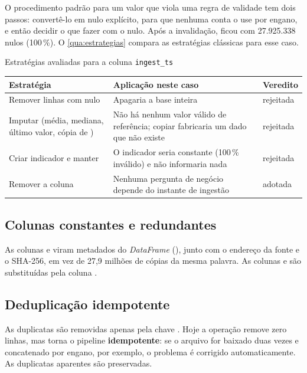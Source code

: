 O procedimento padrão para um valor que viola uma regra de validade tem dois
passos: convertê-lo em nulo explícito, para que nenhuma conta o use por engano,
e então decidir o que fazer com o nulo. Após a invalidação, 
ficou com 27.925.338 nulos (100\,\%). O \autoref{qua:estrategias} compara as
estratégias clássicas para esse caso.

\begin{quadro}[htbp]
\caption{\label{qua:estrategias}Estratégias avaliadas para a coluna \texttt{ingest\_ts}}
\begin{corpotabela}
\begin{tabularx}{\textwidth}{|L{4.6cm}|Y|C{1.8cm}|}
\hline
\textbf{Estratégia} & \textbf{Aplicação neste caso} & \textbf{Veredito} \\ \hline
Remover linhas com nulo & Apagaria a base inteira & rejeitada \\ \hline
Imputar (média, mediana, último valor, cópia de ) & Não há nenhum valor válido de referência; copiar  fabricaria um dado que não existe & rejeitada \\ \hline
Criar indicador e manter & O indicador seria constante (100\,\% inválido) e não informaria nada & rejeitada \\ \hline
Remover a coluna & Nenhuma pergunta de negócio depende do instante de ingestão & adotada \\ \hline
\end{tabularx}
\end{corpotabela}
\fonteautores[Elaborado]
\end{quadro}

\subsection{Colunas constantes e redundantes}\label{sec:constantes}

As colunas  e  viram metadados do
\textit{DataFrame} (), junto com o endereço da fonte e o SHA-256,
em vez de 27,9 milhões de cópias da mesma palavra. As colunas  e
 são substituídas pela coluna .

\subsection{Deduplicação idempotente}\label{sec:dedup}

As duplicatas são removidas apenas pela chave . Hoje a operação
remove zero linhas, mas torna o pipeline \textbf{idempotente}: se o arquivo for
baixado duas vezes e concatenado por engano, por exemplo, o problema é corrigido
automaticamente. As duplicatas aparentes são preservadas.

